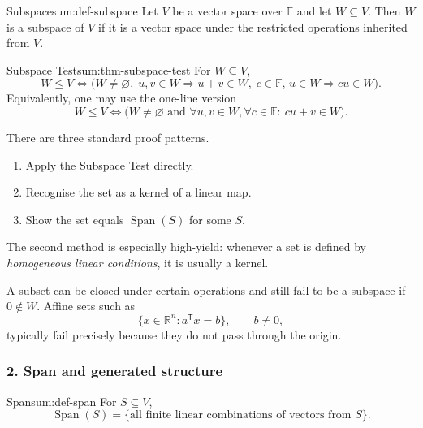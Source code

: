 \begin{definition}{Subspace}{sum:def-subspace}
Let \(V\) be a vector space over \(\mathbb{F}\) and let \(W\subseteq V\). Then \(W\) is a subspace of \(V\) if it is a vector space under the restricted operations inherited from \(V\).
\end{definition}

\begin{theorem}{Subspace Test}{sum:thm-subspace-test}
For \(W\subseteq V\),
\[
W\le V
\iff
\bigl(
W\neq\varnothing,\;
u,v\in W\Rightarrow u+v\in W,\;
c\in\mathbb{F},\,u\in W\Rightarrow cu\in W
\bigr).
\]
Equivalently, one may use the one-line version
\[
W\le V
\iff
\bigl(
W\neq\varnothing
\text{ and }
\forall u,v\in W,\forall c\in\mathbb{F}:\ cu+v\in W
\bigr).
\]
\end{theorem}

\begin{examtip}[title={Exam Focus: fast subspace proofs}]
There are three standard proof patterns.
\begin{enumerate}[leftmargin=*]
    \item Apply the Subspace Test directly.
    \item Recognise the set as a kernel of a linear map.
    \item Show the set equals \(\operatorname{Span}(S)\) for some \(S\).
\end{enumerate}
The second method is especially high-yield: whenever a set is defined by \emph{homogeneous linear conditions}, it is usually a kernel.
\end{examtip}

\begin{commonmistake}[title={Common Mistake: checking closure but forgetting the origin}]
A subset can be closed under certain operations and still fail to be a subspace if \(0\notin W\). Affine sets such as
\[
\{x\in \mathbb{R}^n : a^{\mathsf T}x = b\},\qquad b\neq 0,
\]
typically fail precisely because they do not pass through the origin.
\end{commonmistake}

\subsubsection*{2. Span and generated structure}

\begin{definition}{Span}{sum:def-span}
For \(S\subseteq V\),
\[
\operatorname{Span}(S)
=
\{\text{all finite linear combinations of vectors from }S\}.
\]
\end{definition}

